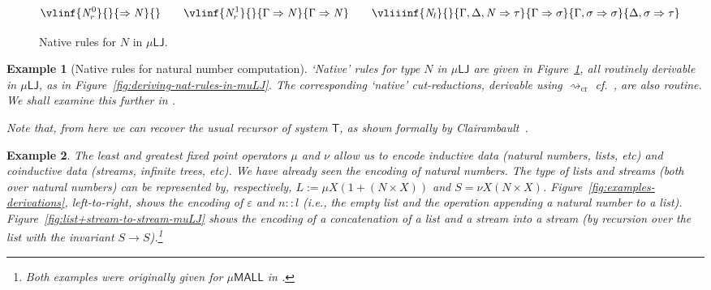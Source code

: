 \documentclass[10pt,a4paper]{amsart}
\theoremstyle{plain}
\newtheorem{example}[example]{Example}
\theoremstyle{definition}
\newcommand{\dfn}{:=}
\newcommand{\red}[1]{{\color{red}#1}}
\newcommand{\anupam}[1]{\todo[color=green]{A: #1}}
\newcommand{\gianluca}[1]{\todo[color=purple]{G: #1}}
\renewcommand{\todo}[1]{}
\renewcommand{\anupam}[1]{}
\renewcommand{\gianluca}[1]{}
\newcommand{\todonew}[1]{{\red{TodoNew: #1}}}
\renewcommand{\todonew}[1]{}
\theoremstyle{plain}
\theoremstyle{definition} %
\newcommand{\nat}{\mathit{N}}
\newcommand{\N}{\nat} %
\newcommand{\unit}{1}
\newcommand{\seqar}{\Rightarrow}
\newcommand{\cnd}{\mathsf{cond}}
\newcommand{\Nzero}{\rr\N^0}
\newcommand{\Nsucc}{\rr\N^1}
\newcommand{\lr}[1]{#1_l}
\newcommand{\rr}[1]{#1_r}
\newcommand{\LJ}{\mathsf{LJ}}
\newcommand{\T}{\mathsf{T}}
\newcommand{\muLJ}{\mu\LJ}
\newcommand{\MALL}{\mathsf{MALL}}
\newcommand{\muMALL}{\mu\MALL}
\newcommand{\rewrite}{\rightsquigarrow}
\newcommand{\cutreduction}{\mathrm{cr}}
\newcommand{\cutred}{\rewrite_{\cutreduction}}
\begin{document}
\begin{figure}
    \[
    \vlinf{\Nzero}{}{\seqar \N}{}
    \qquad 
    \vlinf{\Nsucc}{}{\Gamma \seqar \N}{\Gamma \seqar \N}
    \qquad
    \vliiinf{\lr \N}{}{\Gamma,\Delta, \N \seqar \tau}{\Gamma \seqar \sigma}{\Gamma, \sigma \seqar \sigma}{\Delta, \sigma \seqar \tau}
    \]
    \caption{Native rules for $\N$ in $\muLJ$.}
    \label{fig:native-n-rules-mulj}
\end{figure}
\begin{example}
    [Native rules for natural number computation]
    `Native' rules for type $\N$ in $\muLJ$ are given in Figure~\ref{fig:native-n-rules-mulj}, all routinely derivable in $\muLJ$, as in Figure~\ref{fig:deriving-nat-rules-in-muLJ}.
    The corresponding `native' cut-reductions, derivable using $\cutred$ cf.~, are also routine.
    We shall examine this further in .
    \todonew{give cut reductions?}
     \gianluca{Say that recursor is iteration: we can get proper recursion using pairing.}
    Note that, from here we can recover the usual recursor of system $\T$, as shown formally by Clairambault~\cite{Clairambault13interleaving}.
\end{example}




\begin{example}\label{exmp:examples-of-derivations}
The least and greatest fixed point operators $\mu$ and $\nu$ allow us to encode inductive data (natural numbers, lists, etc) and coinductive data (streams, infinite trees, etc). We have already seen the encoding of natural numbers. The type of lists and streams (both over natural numbers) can be represented by, respectively,  $L\dfn \mu X (\unit + (\N \times X))$ and $S= \nu X (\N \times X)$.
Figure~\ref{fig:examples-derivations}, left-to-right, shows the encoding of  $\varepsilon$ and $n::l$ (i.e., the empty list and the operation appending  a natural number to a list). 
Figure~\ref{fig:list+stream-to-stream-muLJ} shows the encoding of a concatenation of a list and a stream into a stream (by recursion over the list with the invariant $S \to S$).\footnote{Both examples were originally given for $\muMALL$ in \cite{Doumane17thesis}.}
\end{example}
\end{document}
